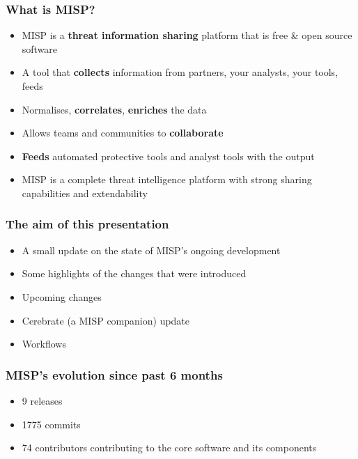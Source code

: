 
\begin{frame}
\titlepage
\end{frame}

\begin{frame}
\frametitle{What is MISP?}
\begin{itemize}
       \item MISP is a {\bf threat information sharing} platform that is free \& open source software
       \item A tool that {\bf collects} information from partners, your analysts, your tools, feeds
       \item Normalises, {\bf correlates}, {\bf enriches} the data
       \item Allows teams and communities to {\bf collaborate}
       \item {\bf Feeds} automated protective tools and analyst tools with the output
       \item MISP is a complete threat intelligence platform with strong sharing capabilities and extendability
\end{itemize}
\end{frame}


\begin{frame}
  \frametitle{The aim of this presentation}
  \begin{itemize}
     \item A small update on the state of MISP's ongoing development
     \item Some highlights of the changes that were introduced
     \item Upcoming changes
     \item Cerebrate (a MISP companion) update
     \item Workflows
  \end{itemize}
\end{frame}

\begin{frame}
  \frametitle{MISP's evolution since past 6 months}
  \begin{itemize}
    \item 9 releases
    \item 1775 commits
    \item 74 contributors contributing to the core software and its components
  \end{itemize}
\end{frame}

